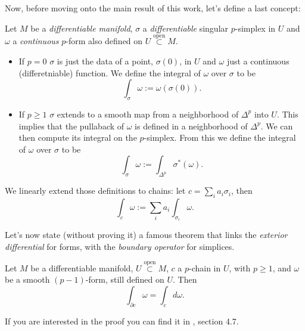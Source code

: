 Now, before moving onto the main result of this work, let's define a last concept:
\begin{defn}
	Let $M$ be a \textit{differentiable manifold}, $\sigma$ a \textit{differentiable} singular $p$-simplex in $U$ and $\omega$ a \textit{continuous} $p$-form also defined on $U \stackrel{\text{open}}{\subset} M$.
	\begin{itemize}
		\item If $p = 0$ $\sigma$ is just the data of a point, $\sigma(0)$, in $U$ and $\omega$ just a continuous (differetniable) function.
			We define the integral of $\omega$ over $\sigma$ to be
			\begin{equation}
				\int_{\sigma}^{} \omega := \omega(\sigma(0)) 
			.\end{equation} 
		\item If $p \geq 1$ $\sigma$ extends to a smooth map from a neighborhood of $\Delta^p$ into $U$.
			This implies that the pullaback of $\omega$ is defined in a neighborhood of $\Delta^p$.
			We can then compute its integral on the $p$-simplex.
			From this we define the integral of $\omega$ over $\sigma$ to be
			\begin{equation}
				\int_{\sigma}^{} \omega := \int_{\Delta^p}^{} \sigma^*(\omega)  
			.\end{equation} 
	\end{itemize} 
	We linearly extend those definitions to chains:
	let $c = \sum_{i}^{}a_i \sigma_i$, then
	\begin{equation}
	\int_{c}^{} \omega := \sum_{i}^{} a_i \int_{\sigma_i}^{} \omega  
	.\end{equation} 
\end{defn}
Let's now state (without proving it) a famous theorem that links the \textit{exterior differential} for forms, with the \textit{boundary operator} for simplices.

\begin{thm}
	Let $M$ be a differentiable manifold, $U \stackrel{\text{open}}{\subset} M$, $c$ a $p$-chain in $U$, with $p \geq 1$, and $\omega$ be a smooth $(p-1)$-form, still defined on $U$.
	Then
	\begin{equation}
	\int_{\partial c}^{} \omega = \int_{c}^{} d\omega
	.\end{equation} 
\end{thm}
If you are interested in the proof you can find it in \cite{warner}, section 4.7.

